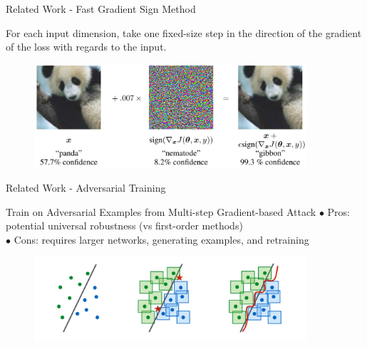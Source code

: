 \documentclass{beamer}
\begin{document}
\begin{frame}{Related Work - Fast Gradient Sign Method}
    \begin{block}{}
    For each input dimension, take one fixed-size step in the direction of the gradient of the loss with regards to the input.
    \end{block}

   \begin{figure} 
       \includegraphics[width=0.9\textwidth]{images/Related-Work/FGSM-Example.PNG}
       \caption*{\cite{goodfellow2015explaining} }
   \end{figure}
\end{frame}

\begin{frame}{Related Work - Adversarial Training}
    \begin{block}{Train on Adversarial Examples from Multi-step Gradient-based Attack }
        $\bullet$ Pros: potential universal robustness (vs first-order methods) \\
        $\bullet$ Cons: requires larger networks, generating examples, and retraining 
    \end{block}
    
   \begin{figure} 
       \includegraphics[width=0.9\textwidth]{images/Related-Work/adversarial-training.PNG}
       \caption*{\cite{madry2019deep} }
   \end{figure}
    
\end{frame}
\end{document}
